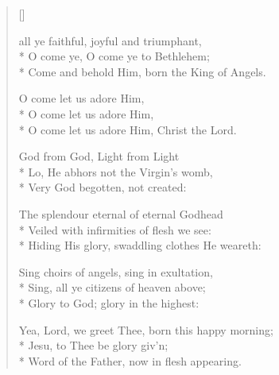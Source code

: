 \newHymn
{}
\settowidth{\versewidth}{O come ye, O come ye to Bethlehehem}

\begin{verse}[\versewidth]

 all ye faithful, joyful and triumphant,\\*
O come ye, O come ye to Bethlehem;\\*
Come and behold Him, born the King of Angels.
\pointorig

\begin{indentedVerse}
\vin O come let us adore Him,\\*
\vin O come let us adore Him, \\*
\vin O come let us adore Him, Christ the Lord. 
\end{indentedVerse}

God from God, Light from Light\\*
Lo, He abhors not the Virgin's womb,\\*
Very God begotten, not created:

The splendour eternal of eternal Godhead\\*
Veiled with infirmities of flesh we see:\\*
Hiding His glory, swaddling clothes He weareth: 

 Sing choirs of angels, sing in exultation,\\*
Sing, all ye citizens of heaven above;\\*
Glory to God; glory in the highest:

 Yea, Lord, we greet Thee, born this happy morning;\\*
Jesu, to Thee be glory giv'n;\\*
Word of the Father, now in flesh appearing.

\end{verse}


